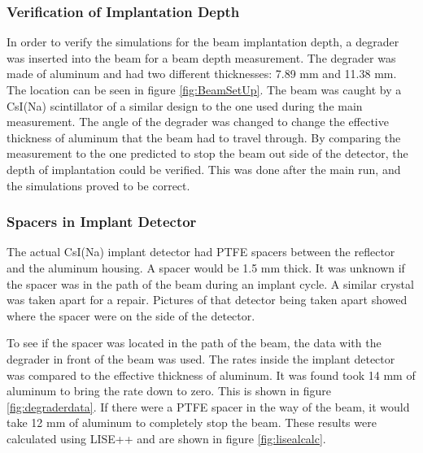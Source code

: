 \documentclass[../MaxHughesThesis.tex]{subfiles}
\begin{document}
\subsubsection{Verification of Implantation Depth}

In order to verify the simulations for the beam implantation depth, a degrader was inserted into the beam for a beam depth measurement.
The degrader was made of aluminum and had two different thicknesses: 7.89 mm and 11.38 mm. 
The location can be seen in figure \ref{fig:BeamSetUp}.
The beam was caught by a CsI(Na) scintillator of a similar design to the one used during the main measurement.
The angle of the degrader was changed to change the effective thickness of aluminum that the beam had to travel through. 
By comparing the measurement to the one predicted to stop the beam out side of the detector, the depth of implantation could be verified. 
This was done after the main run, and the simulations proved to be correct.

\subsubsection{Spacers in Implant Detector}
The actual CsI(Na) implant detector had PTFE spacers between the reflector and the aluminum housing.
A spacer would be 1.5 mm thick. 
It was unknown if the spacer was in the path of the beam during an implant cycle. 
A similar crystal was taken apart for a repair. 
Pictures of that detector being taken apart showed where the spacer were on the side of the detector. 



To see if the spacer was located in the path of the beam, the data with the degrader in front of the beam was used.
The rates inside the implant detector was compared to the effective thickness of aluminum. 
It was found took 14 mm of aluminum to bring the rate down to zero.
This is shown in figure \ref{fig:degraderdata}.
If there were a PTFE spacer in the way of the beam, it would take 12 mm of aluminum to completely stop the beam.
These results were calculated using LISE++ and are shown in figure \ref{fig:lisealcalc}.
\end{document}
